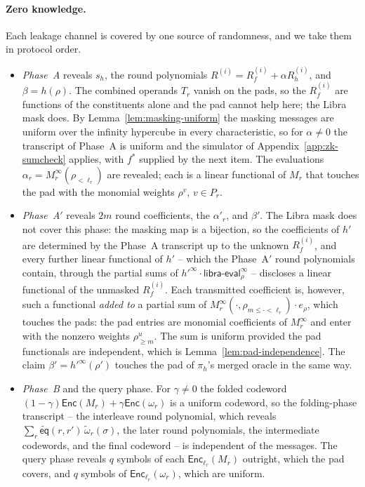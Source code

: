 \documentclass{article}
\theoremstyle{definition}
\newcommand*{\mle}{\widetilde}
\newcommand{\eq}{\mathsf{eq}}
\begin{document}
\paragraph{Zero knowledge.}
Each leakage channel is covered by one source of randomness, and we take them in protocol order.
\begin{itemize}
\item \emph{Phase~A} reveals $s_h$, the round polynomials $R^{(i)} = R_f^{(i)} + \alpha R_h^{(i)}$, and $\beta = h(\rho)$. The combined operands $T_r$ vanish on the pads, so the $R_f^{(i)}$ are functions of the constituents alone and the pad cannot help here; the Libra mask does. By Lemma~\ref{lem:masking-uniform} the masking messages are uniform over the infinity hypercube in every characteristic, so for $\alpha \ne 0$ the transcript of Phase~A is uniform and the simulator of Appendix~\ref{app:zk-sumcheck} applies, with $f^*$ supplied by the next item. The evaluations $\alpha_r = M_r^\infty(\rho_{< \ell_r})$ are revealed; each is a linear functional of $M_r$ that touches the pad with the monomial weights $\rho^v$, $v \in P_r$.
\item \emph{Phase~A$'$} reveals $2m$ round coefficients, the $\alpha'_r$, and $\beta'$. The Libra mask does not cover this phase: the masking map is a bijection, so the coefficients of $h'$ are determined by the Phase~A transcript up to the unknown $R_f^{(i)}$, and every further linear functional of $h'$ -- which the Phase~A$'$ round polynomials contain, through the partial sums of $h'^\infty \cdot \textsf{libra-eval}_\rho^\infty$ -- discloses a linear functional of the unmasked $R_f^{(i)}$. Each transmitted coefficient is, however, such a functional \emph{added to} a partial sum of $M_r^\infty(\cdot, \rho_{m \le \cdot < \ell_r}) \cdot e_\rho$, which touches the pads: the pad entries are monomial coefficients of $M_r^\infty$ and enter with the nonzero weights $\rho_{\ge m}^{u}$. The sum is uniform provided the pad functionals are independent, which is Lemma~\ref{lem:pad-independence}. The claim $\beta' = h'^\infty(\rho')$ touches the pad of $\pi_h$'s merged oracle in the same way.
\item \emph{Phase~B} and the query phase. For $\gamma \ne 0$ the folded codeword $(1 - \gamma) \textsf{Enc}(M_r) + \gamma \textsf{Enc}(\omega_r)$ is a uniform codeword, so the folding-phase transcript -- the interleave round polynomial, which reveals $\sum_r \mle{\eq}(r, r')\, \mle{\omega}_r(\sigma)$, the later round polynomials, the intermediate codewords, and the final codeword -- is independent of the messages. The query phase reveals $q$ symbols of each $\textsf{Enc}_{\ell_r}(M_r)$ outright, which the pad covers, and $q$ symbols of $\textsf{Enc}_{\ell_r}(\omega_r)$, which are uniform.
\end{itemize}
\end{document}
